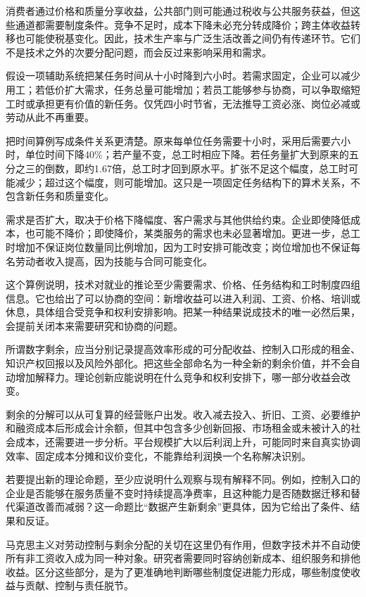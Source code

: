 \documentclass[UTF8,fontset=fandol,zihao=-4,oneside,openany]{ctexbook}
\begin{document}
消费者通过价格和质量分享收益，公共部门则可能通过税收与公共服务获益，但这些通道都需要制度条件。竞争不足时，成本下降未必充分转成降价；跨主体收益转移也可能使税基变化。因此，技术生产率与广泛生活改善之间仍有传递环节。它们不是技术之外的次要分配问题，而会反过来影响采用和需求。

假设一项辅助系统把某任务时间从十小时降到六小时。若需求固定，企业可以减少用工；若低价扩大需求，任务总量可能增加；若员工能够参与协商，可以争取缩短工时或承担更有价值的新任务。仅凭四小时节省，无法推导工资必涨、岗位必减或劳动从此不再重要。

\label{arg:P194}
把时间算例写成条件关系更清楚。原来每单位任务需要十小时，采用后需要六小时，单位时间下降40\%；若产量不变，总工时相应下降。若任务量扩大到原来的五分之三的倒数，即约1.67倍，总工时才回到原水平。扩张不足这个幅度，总工时可能减少；超过这个幅度，则可能增加。这只是一项固定任务结构下的算术关系，不包含新任务和质量变化。

需求是否扩大，取决于价格下降幅度、客户需求与其他供给约束。企业即使降低成本，也可能不降价；即使降价，某类服务的需求也未必显著增加。更进一步，总工时增加不保证岗位数量同比例增加，因为工时安排可能改变；岗位增加也不保证每名劳动者收入提高，因为技能与合同可能变化。

这个算例说明，技术对就业的推论至少需要需求、价格、任务结构和工时制度四组信息。它也给出了可以协商的空间：新增收益可以进入利润、工资、价格、培训或休息，具体组合受竞争和权利安排影响。把某一种结果说成技术的唯一必然后果，会提前关闭本来需要研究和协商的问题。

所谓数字剩余，应当分别记录提高效率形成的可分配收益、控制入口形成的租金、知识产权回报以及风险外部化。把这些全部命名为一种全新的剩余价值，并不会自动增加解释力。理论创新应能说明在什么竞争和权利安排下，哪一部分收益会改变。

\label{arg:P195}
剩余的分解可以从可复算的经营账户出发。收入减去投入、折旧、工资、必要维护和融资成本后形成会计余额，但其中包含多少创新回报、市场租金或未被计入的社会成本，还需要进一步分析。平台规模扩大以后利润上升，可能同时来自真实协调效率、固定成本分摊和议价变化，不能靠给利润换一个名称解决识别。

若要提出新的理论命题，至少应说明什么观察与现有解释不同。例如，控制入口的企业是否能够在服务质量不变时持续提高净费率，且这种能力是否随数据迁移和替代渠道改善而减弱？这一命题比“数据产生新剩余”更具体，因为它给出了条件、结果和反证。

马克思主义对劳动控制与剩余分配的关切在这里仍有作用，但数字技术并不自动使所有非工资收入成为同一种对象。研究者需要同时容纳创新成本、组织服务和排他收益。区分这些部分，是为了更准确地判断哪些制度促进能力形成，哪些制度使收益与贡献、控制与责任脱节。
\end{document}
